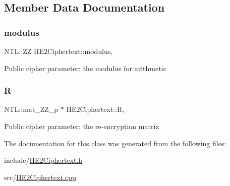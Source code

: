 \subsection{Member Data Documentation}
\mbox{\label{classHE2Ciphertext_a590c7d8432a2a73ebe0607f402c6a46a}} 
\subsubsection{\texorpdfstring{modulus}{modulus}}
{\footnotesize\ttfamily N\+T\+L\+::\+ZZ H\+E2\+Ciphertext\+::modulus\hspace{0.3cm}{\ttfamily [static]}, {\ttfamily [private]}}

Public cipher parameter\+: the modulus for arithmetic \mbox{\label{classHE2Ciphertext_aad6e0d90aa41cb80b75feebc1b07e1c0}} 
\subsubsection{\texorpdfstring{R}{R}}
{\footnotesize\ttfamily N\+T\+L\+::mat\+\_\+\+Z\+Z\+\_\+p $\ast$ H\+E2\+Ciphertext\+::R\hspace{0.3cm}{\ttfamily [static]}, {\ttfamily [private]}}

Public cipher parameter\+: the re-\/encryption matrix 

The documentation for this class was generated from the following files\+:\begin{DoxyCompactItemize}
\item 
include/\hyperlink{HE2Ciphertext_8h}{H\+E2\+Ciphertext.\+h}\item 
src/\hyperlink{HE2Ciphertext_8cpp}{H\+E2\+Ciphertext.\+cpp}\end{DoxyCompactItemize}
